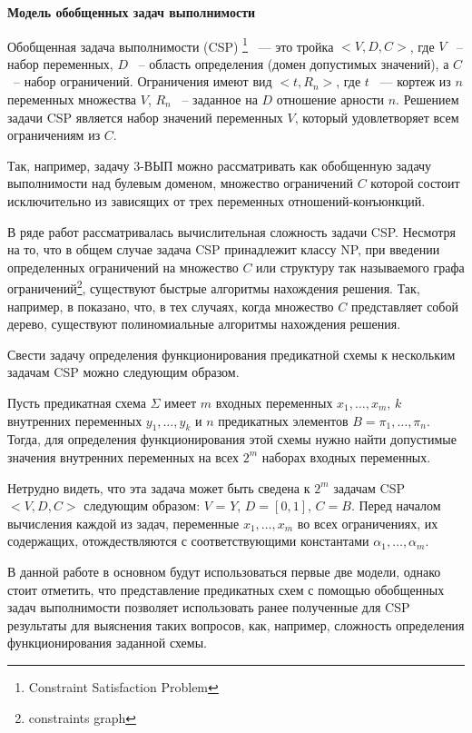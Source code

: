 \documentclass[12pt]{article}
\newenvironment{definition}[1][Определение]{\begin{trivlist}
\item[\hskip \labelsep {\bfseries #1}]}{\end{trivlist}}
\begin{document}
\textbf{Модель обобщенных задач выполнимости}

\begin{definition}
Обобщенная задача выполнимости (CSP) \footnote{Constraint Satisfaction Problem} 
~--- это тройка $<V,D,C>$, где $V$ ~-- набор переменных, $D$ ~-- область определения (домен допустимых значений), 
а $C$ ~-- набор ограничений. Ограничения имеют вид $<t, R_n>$, где $t$ ~--- кортеж из $n$ переменных множества $V$, 
$R_n$ ~-- заданное на $D$ отношение арности $n$. 
Решением задачи CSP является набор значений переменных $V$, который удовлетворяет всем ограничениям из $C$. 
\end{definition}

Так, например, задачу 3-ВЫП можно рассматривать как обобщенную задачу выполнимости над булевым доменом, множество
ограничений $C$ которой состоит исключительно из зависящих от трех переменных отношений-конъюнкций.

В ряде работ рассматривалась вычислительная сложность задачи CSP. Несмотря на то, что в общем случае задача CSP
принадлежит классу NP, при введении определенных ограничений на множество $C$ или структуру так называемого
графа ограничений\footnote{constraints graph}, существуют быстрые алгоритмы нахождения решения. 
Так, например, в \cite{Shaeffer78} показано, 
что, в тех случаях, когда множество $C$ представляет собой дерево, существуют полиномиальные алгоритмы нахождения решения.

Свести задачу определения функционирования предикатной схемы к нескольким задачам CSP можно следующим образом.

Пусть предикатная схема $\Sigma$ имеет $m$ входных переменных $x_1, \ldots , x_m$, 
$k$ внутренних переменных $y_1, \ldots , y_k$ и $n$ предикатных элементов $B = \pi_1, \dots , \pi_n$. 
Тогда, для определения функционирования этой схемы нужно найти допустимые значения внутренних переменных на всех $2^{m}$
наборах входных переменных. 

Нетрудно видеть, что эта задача может быть сведена к $2^m$ задачам CSP $<V, D, C>$ следующим образом:
$V$ = $Y$, $D = [0, 1]$, $C = B$. Перед началом вычисления каждой из задач, переменные $x_1, \ldots , x_m$ 
во всех ограничениях, их содержащих, отождествляются с соответствующими константами $\alpha_1, \ldots , \alpha_m$.

В данной работе в основном будут использоваться первые две модели, однако стоит отметить, что представление предикатных
схем с помощью обобщенных задач выполнимости позволяет использовать ранее полученные для CSP результаты для 
выяснения таких вопросов, как, например, сложность определения функционирования заданной схемы.
\end{document}
